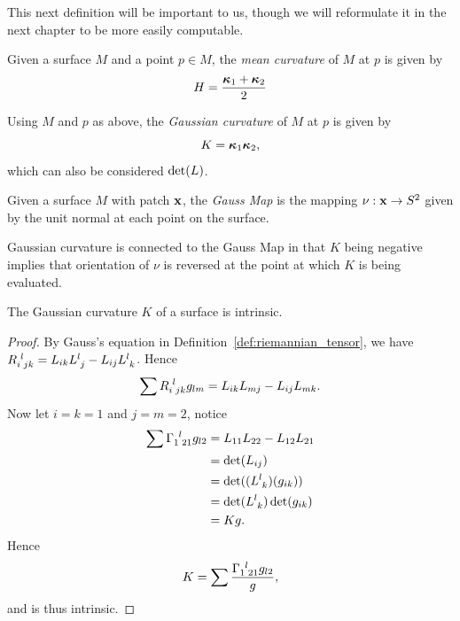   This next definition will be important to us, though we will reformulate it in the next chapter to be more easily computable.
  \begin{defn}
    Given a surface $M$ and a point $p \in M$, the \emph{mean curvature} of $M$ at $p$ is given by
    \begin{equation}
      \label{eq:mean_curvature}
      H = \frac{\boldsymbol{\kappa}_1 + \boldsymbol{\kappa}_2}{2}
    \end{equation}
  \end{defn}


  \begin{defn}
    Using $M$ and $p$ as above, the \emph{Gaussian curvature} of $M$ at $p$ is given by
    \begin{equation}
      K = \boldsymbol{\kappa}_1\boldsymbol{\kappa}_2,
    \end{equation}
    which can also be considered $\det(L)$.
  \end{defn}

  \begin{defn}
    Given a surface $M$ with patch $\mathbf{x}$, the \emph{Gauss Map} is the mapping $\nu:\mathbf{x}\to S^2$ given by the unit normal at each point on the surface.
  \end{defn}

  Gaussian curvature is connected to the Gauss Map in that $K$ being negative implies that orientation of $\nu$ is reversed at the point at which $K$ is being evaluated.

  \begin{thm}
    The Gaussian curvature $K$ of a surface is intrinsic.
  \end{thm}
  \begin{proof}
    By Gauss's equation in Definition~\ref{def:riemannian_tensor}, we have $\Rmn = L_{ik}\llk{l}{j} - L_{ij}\Llk$. Hence
    \[
      \sum\Rmn g_{lm} = L_{ik}L_{mj} - L_{ij}L_{mk}.
    \]
    Now let $i = k = 1$ and $j = m = 2$, notice
    \begin{align*}
      \sum\rmn{1}{l}{2}{1}g_{l2} &= L_{11}L_{22} - L_{12}L_{21}\\
      &= \det(L_{ij})\\
      &= \det((\Llk) (g_{ik}))\\
      &= \det(\Llk)\det(g_{ik})\\
      &= K g.
    \end{align*}
    Hence
    \[
      K = \sum\frac{\rmn{1}{l}{2}{1}g_{l2}}{g},
    \]
    and is thus intrinsic.
  \end{proof}

